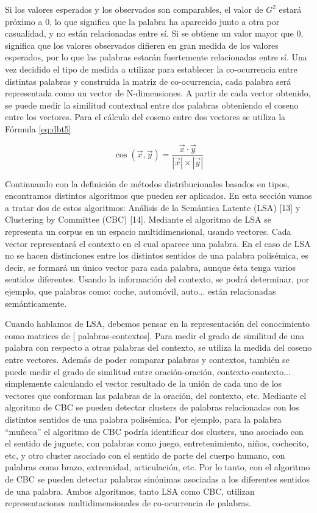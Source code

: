 Si los valores esperados y los observados son comparables, el valor de $G^2$ estará próximo a 0, lo que significa que la palabra ha aparecido junto a otra por casualidad, y no están relacionadas entre sí. Si se obtiene un valor mayor que 0, significa que los valores observados difieren en gran medida de los valores esperados, por lo que las palabras estarán fuertemente relacionadas entre sí.
Una vez decidido el tipo de medida a utilizar para establecer la co-ocurrencia entre distintas palabras y construida la matriz de co-ocurrencia, cada palabra será representada como un vector de N-dimensiones. A partir de cada vector obtenido, se puede medir la similitud contextual entre dos palabras obteniendo el coseno entre los vectores. Para el cálculo del coseno entre dos vectores se utiliza la Fórmula \ref{eq:dbt5}

\begin{equation}
  \cos (\vec{x},\vec{y})=\frac{\vec{x}\cdot\vec{y}}{|\vec{x}|\times |\vec{y}|}
  \label{eq:dbt5}
\end{equation}

Continuando con la definición de métodos distribucionales basados en tipos, encontramos distintos algoritmos que pueden ser aplicados. En esta sección vamos a tratar dos de estos algoritmos: Análisis de la Semántica Latente (LSA) [13] y Clustering by Committee (CBC) [14]. Mediante el algoritmo de LSA se representa un corpus en un espacio multidimensional, usando vectores. Cada vector representará el contexto en el cual aparece una palabra. En el caso de LSA no se hacen distinciones entre los distintos sentidos de una palabra polisémica, es decir, se formará un único vector para cada palabra, aunque ésta tenga varios sentidos diferentes. Usando la información del contexto, se podrá determinar, por ejemplo, que palabras como: coche, automóvil, auto... están relacionadas semánticamente.

Cuando hablamos de LSA, debemos pensar en la representación del conocimiento como matrices de [ palabras-contextos]. Para medir el grado de similitud de una palabra con respecto a otras palabras del contexto, se utiliza la medida del coseno entre vectores. Además de poder comparar palabras y contextos, también se puede medir el grado de similitud entre oración-oración, contexto-contexto... simplemente calculando el vector resultado de la unión de cada uno de los vectores que conforman las palabras de la oración, del contexto, etc. Mediante el algoritmo de CBC se pueden detectar clusters de palabras relacionadas con los distintos sentidos de una palabra polisémica. Por ejemplo, para la palabra “muñeca” el algoritmo de CBC podría identificar dos clusters, uno asociado con el sentido de juguete, con palabras como juego, entretenimiento, niños, cochecito, etc, y otro cluster asociado con el sentido de parte del cuerpo humano, con palabras como brazo, extremidad, articulación, etc. Por lo tanto, con el algoritmo de CBC se pueden detectar palabras sinónimas asociadas a los diferentes sentidos de una palabra. Ambos algoritmos, tanto LSA como CBC, utilizan representaciones multidimensionales de co-ocurrencia de palabras.

